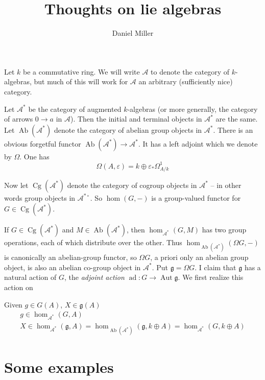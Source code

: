 \documentclass{article}
\title{Thoughts on lie algebras}
\author{Daniel Miller}
\DeclareMathOperator{\abelian}{Ab}
\DeclareMathOperator{\adjoint}{ad}
\DeclareMathOperator{\automorphism}{Aut}
\DeclareMathOperator{\cogroup}{Cg}
\newcommand{\cA}{\mathcal{A}}
\newcommand{\fg}{\mathfrak{g}}
\begin{document}
\maketitle





Let $k$ be a commutative ring. We will write $\cA$ to denote the category of 
$k$-algebras, but much of this will work for $\cA$ an arbitrary (sufficiently 
nice) category. 

Let $\cA^\ast$ be the category of augmented $k$-algebras (or more generally, 
the category of arrows $0 \to a$ in $\cA$). Then the initial and terminal 
objects in $\cA^\ast$ are the same. Let $\abelian(\cA^\ast)$ denote the 
category of abelian group objects in $\cA^\ast$. There is an obvious 
forgetful functor $\abelian(\cA^\ast) \to \cA^\ast$. It has a left adjoint 
which we denote by $\Omega$. One has 
\[
  \Omega(A,\varepsilon) = k\oplus \varepsilon_\ast\Omega_{A/k}^1
\]

Now let $\cogroup(\cA^\ast)$ denote the category of cogroup objects in 
$\cA^\ast$ -- in other words group objects in $\cA^{\ast\circ}$. So 
$\hom(G,-)$ is a group-valued functor for $G\in \cogroup(\cA^\ast)$. 

If $G\in \cogroup(\cA^\ast)$ and $M\in \abelian(\cA^\ast)$, then 
$\hom_{\cA^\ast}(G,M)$ has two group operations, each of which distribute 
over the other. Thus $\hom_{\abelian(\cA^\ast)}(\Omega G,-)$ is canonically 
an abelian-group functor, so $\Omega G$, a priori only an abelian group 
object, is also an abelian co-group object in $\cA^\ast$. Put 
$\fg=\Omega G$. I claim that $\fg$ has a natural action of $G$, the 
\emph{adjoint action} $\adjoint:G\to \automorphism \fg$. We first realize 
this action on 

Given 
$g\in G(A)$, $X\in \fg(A)$
\begin{align*}
  g\in \hom_{\cA^\ast}(G,A) \\
  X\in \hom_{\cA^\ast}(\fg,A) = \hom_{\abelian(\cA^\ast)}(\fg, k\oplus A) = \hom_{\cA^\ast}(G,k\oplus A)
\end{align*}





\section{Some examples}
\end{document}
